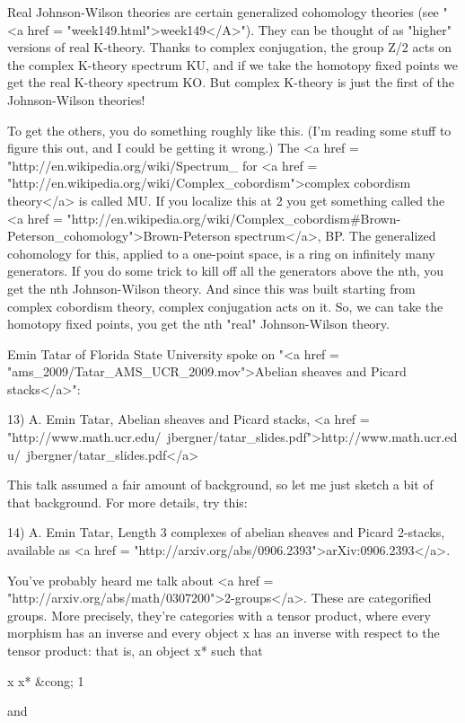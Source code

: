 Real Johnson-Wilson theories are certain generalized cohomology
theories (see "<a href = "week149.html">week149</A>").
They can be thought of as "higher" versions of real
K-theory.  Thanks to complex conjugation, the group Z/2 acts on the
complex K-theory spectrum KU, and if we take the homotopy fixed points
we get the real K-theory spectrum KO.  But complex K-theory is just
the first of the Johnson-Wilson theories!

To get the others, you do something roughly like this.  (I'm reading
some stuff to figure this out, and I could be getting it wrong.)  The
<a href =
"http://en.wikipedia.org/wiki/Spectrum_%
for <a href = "http://en.wikipedia.org/wiki/Complex_cobordism">complex
cobordism theory</a> is called MU.  If you localize this at 2 you get
something called the <a href =
"http://en.wikipedia.org/wiki/Complex_cobordism#Brown-Peterson_cohomology">Brown-Peterson
spectrum</a>, BP.  The generalized cohomology for this, applied to a
one-point space, is a ring on infinitely many generators.  If you do
some trick to kill off all the generators above the nth, you get the
nth Johnson-Wilson theory.  And since this was built starting from
complex cobordism theory, complex conjugation acts on it.  So, we can
take the homotopy fixed points, you get the nth "real"
Johnson-Wilson theory.

Emin Tatar of Florida State University spoke on "<a href =
"ams_2009/Tatar_AMS_UCR_2009.mov">Abelian sheaves and Picard
stacks</a>":

13) A. Emin Tatar, Abelian sheaves and Picard stacks, 
<a href = "http://www.math.ucr.edu/~jbergner/tatar_slides.pdf">http://www.math.ucr.edu/~jbergner/tatar_slides.pdf</a>

This talk assumed a fair amount of background, so let me just sketch a
bit of that background.  For more details, try this:

14) A. Emin Tatar, Length 3 complexes of abelian sheaves and Picard
2-stacks, available as <a href = "http://arxiv.org/abs/0906.2393">arXiv:0906.2393</a>.

You've probably heard me talk about <a href =
"http://arxiv.org/abs/math/0307200">2-groups</a>.  These are
categorified groups.  More precisely, they're categories with a tensor
product, where every morphism has an inverse and every object x has an
inverse with respect to the tensor product: that is, an object x* such
that

x \otimes  x* &cong; 1

and

